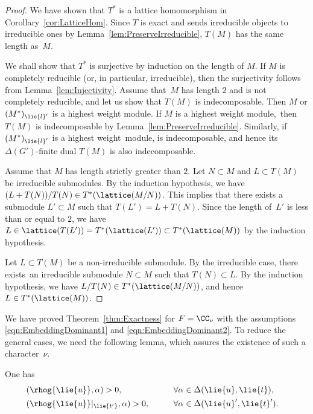 \begin{proof}
	We have shown that $T^*$ is a lattice homomorphism in Corollary~\ref{cor:LatticeHom}.
	Since $T$ is exact and sends irreducible objects to irreducible ones by Lemma~\ref{lem:PreserveIrreducible}, $T(M)$ has the same length as~$M$.

	We shall show that $T^*$ is surjective by induction on the length of $M$.
	If $M$ is completely reducible (or, in particular, irreducible), then the surjectivity follows from Lemma~\ref{lem:Injectivity}.
	Assume that~$M$ has length $2$ and is not completely reducible, and let us show that $T(M)$ is indecomposable.
	Then $M$ or $(M^*)_{\lie{l}'}$ is a highest weight module.
	If $M$ is a highest weight module,~then~$T(M)$ is indecomposable by Lemma~\ref{lem:PreserveIrreducible}.
	Similarly, if $(M^*)_{\lie{l}'}$ is a highest weight~module,  is indecomposable, and hence its $\Delta(G')$-finite dual $T(M)$ is also indecomposable.

	Assume that $M$ has length strictly greater than $2$.
	Let $N\subset M$ and $L\subset T(M)$ be irreducible submodules.
	By the induction hypothesis, we have $(L+T(N))/T(N) \in T^*(\lattice(M/N))$.
	This implies that there exists a submodule $L'\subset M$ such that $T(L') = L + T(N)$.
	Since the length of~$L'$ is less than or equal to $2$, we have $L \in \lattice(T(L')) = T^*(\lattice(L'))\subset T^*(\lattice(M))$ by the induction hypothesis.

	Let $L\subset T(M)$ be a non-irreducible submodule.
	By the irreducible case, there exists~an irreducible submodule $N \subset M$ such that $T(N)\subset L$.
	By the induction hypothesis, we have $L/T(N) \in T^*(\lattice(M/N))$, and hence $L \in T^*(\lattice(M))$.
\end{proof}

We have proved Theorem~\ref{thm:Exactness} for $F = \CC_{\nu}$ with the assumptions \eqref{eqn:EmbeddingDominant1} and \eqref{eqn:EmbeddingDominant2}.
To reduce the general cases, we need the following lemma, which assures the existence of such a character~$\nu$.

\begin{Lemma}\label{lem:PositivityRho}
	One has
	\begin{alignat*}{3}
		&(\rhog{\lie{u}}, \alpha)> 0, \qquad&& \forall \alpha \in \Delta(\lie{u}, \lie{t}),&\\
		&(\rhog{\lie{u}}|_{\lie{t'}}, \alpha)> 0, \qquad&& \forall \alpha \in \Delta(\lie{u}', \lie{t}').&
	\end{alignat*}
\end{Lemma}

